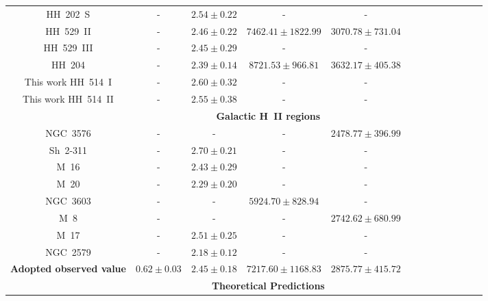 \documentclass[fleqn,usenatbib]{mnras}
\begin{document}
\begin{table}
\begin{tabular}{ccccccccccccc}
\citet{mesadelgado09} HH~202~S & - & $2.54 \pm 0.22$ & -&-\\

\citet{mendez2021} HH~529~II &-&$2.46 \pm 0.22$&$7462.41 \pm 1822.99$&$3070.78 \pm 731.04$\\

\citet{mendez2021} HH~529~III &-&$2.45 \pm 0.29$ & - & -\\


\citet{mendez2021-2} HH~204 & - & $2.39 \pm 0.14$ & $8721.53 \pm 966.81$ & $3632.17 \pm 405.38$\\

This work HH~514~I & - & $2.60 \pm 0.32$ &-&-\\

This work HH~514~II & - & $2.55 \pm 0.38$ &-&-\\

 & \multicolumn{4}{c}{{\bf Galactic H~II regions}}\\

\citet{garciarojas04} NGC~3576 & -& - & - & $2478.77 \pm 396.99$ \\

\citet{garciarojas05} Sh~2-311& - & $2.70\pm 0.21$&-&-\\

\citet{garciarojas06} M~16 &-&$ 2.43\pm 0.29$&-&-\\

\citet{garciarojas06} M~20 & -& $ 2.29\pm 0.20$&-&-\\

\citet{garciarojas06} NGC~3603 & - & - & $5924.70 \pm 828.94$ & - \\

\citet{garciarojas07-2} M~8 &-& - &- & $2742.62 \pm 680.99$  \\

\citet{garciarojas07-2} M~17 &-& $2.51 \pm 0.25$ &-&-\\

\citet{Esteban13} NGC~2579 &- &$2.18 \pm 0.12$ &-&-\\



{\bf Adopted observed value} & \boldmath $0.62 \pm 0.03$ & \boldmath $2.45 \pm 0.18$& \boldmath$ 7217.60\pm 1168.83$ & \boldmath $2875.77\pm415.72$\\

 & \multicolumn{4}{c}{{\bf Theoretical Predictions}}\\


\end{tabular}
\end{table}
\end{document}
